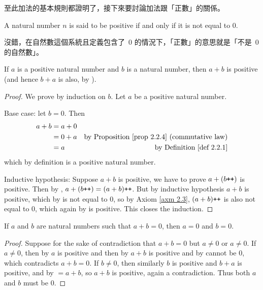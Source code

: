 \begin{note}
至此加法的基本規則都證明了，接下來要討論加法跟「正數」的關係。
\end{note}

\begin{definition} \label{def 2.2.7} A natural number \(n\) is said to be positive if and only if it is not equal to \(0\).
\end{definition}
\begin{note}
沒錯，在自然數這個系統且定義包含了\ \(0\) 的情況下，「正數」的意思就是「不是\ \(0\) 的自然數」。
\end{note}

\begin{proposition}\label{prop 2.2.8} If \(a\) is a positive natural number and \(b\) is a natural number, then \(a + b\) is positive (and hence \(b + a\) is also, by ).
\end{proposition}

\begin{proof}
We prove by induction on \(b\). Let \(a\) be a positive natural number.

Base case: let \(b = 0\). Then
\begin{align*}
a + b & = a + 0 & \\
      & = 0 + a & \text{by \PROP{2.2.4} (commutative law)} \\
      & = a     & \text{by \DEF{2.2.1}}
\end{align*}
which by definition is a positive natural number.

Inductive hypothesis: Suppose \(a + b\) is positive, we have to prove \(a + (b\texttt{++})\) is positive. Then by , \(a + (b\texttt{++}) = (a + b)\texttt{++}\). But by inductive hypothesis \(a + b\) is positive, which by  is not equal to \(0\), so by Axiom \ref{axm 2.3}, \((a + b)\texttt{++}\) is also not equal to \(0\), which again by  is positive. This closes the induction.
\end{proof}

\begin{corollary} \label{corollary 2.2.9}
If \(a\) and \(b\) are natural numbers such that \(a + b = 0\), then \(a = 0\) and \(b = 0\).
\end{corollary}

\begin{proof}
Suppose for the sake of contradiction that \(a + b = 0\) but \(a \neq 0\) or \(a \neq 0\). If \(a \neq 0\), then by  \(a\) is positive and then by  \(a + b\) is positive and by  cannot be \(0\), which contradicts \(a + b = 0\). If \(b \neq 0\), then similarly \(b\) is positive and \(b + a\) is positive, and by  \(= a + b\), so \(a + b\) is positive, again a contradiction. Thus both \(a\) and \(b\) must be \(0\).
\end{proof}

